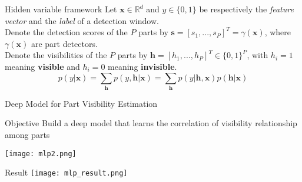 \begin{frame}{Hidden variable framework}
\small
Let $\mathbf{x}\in\mathbb{R}^d$ and $y\in\lbrace0,1\rbrace$ be respectively the \textit{feature vector} and the \textit{label} of a detection window.\\
\vspace{3mm}
Denote the detection scores of the $P$ parts by $\mathbf{s} = [s_1,...,s_P]^T = \gamma(\mathbf{x})$, where $\gamma(\mathbf{x})$ are part detectors.\\
\vspace{3mm}
Denote the visibilities of the $P$ parts by $\mathbf{h} = [h_1,...,h_P]^T \in\lbrace0,1\rbrace^P$, with $h_i = 1$ meaning \textbf{visible} and $h_i = 0$ meaning \textbf{invisible}.
\begin{equation}
  p(y\vert\mathbf{x}) = \sum_\mathbf{h}p(y,\mathbf{h}\vert\mathbf{x}) = \sum_\mathbf{h}p(y\vert\mathbf{h},\mathbf{x})p(\mathbf{h}\vert\mathbf{x})
\end{equation}

\end{frame}






\begin{frame}{Deep Model for Part Visibility Estimation}
  \small
  \begin{block}{Objective}
    Build a deep model that learns the correlation of visibility
     relationship among parts
  \end{block}
  \pause
\centering
\texttt{[image: mlp2.png]}
\\
\end{frame}

\begin{frame}{Result}
  \texttt{[image: mlp\_result.png]}
\end{frame}
